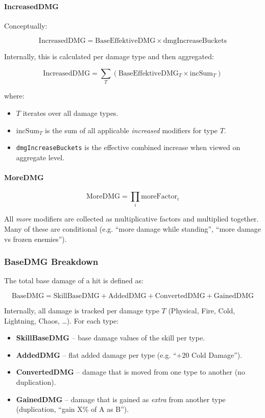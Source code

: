 \paragraph{IncreasedDMG}

Conceptually:

\[
\text{IncreasedDMG} = \text{BaseEffektiveDMG} \times \text{dmgIncreaseBuckets}
\]

Internally, this is calculated per damage type and then aggregated:

\[
\text{IncreasedDMG} = \sum_T \left(\text{BaseEffektiveDMG}_T \times \text{incSum}_T\right)
\]

where:

\begin{itemize}
	\item $T$ iterates over all damage types.
	\item $\text{incSum}_T$ is the sum of all applicable \emph{increased} modifiers for type $T$.
	\item \texttt{dmgIncreaseBuckets} is the effective combined increase when viewed on aggregate level.
\end{itemize}

\paragraph{MoreDMG}

\[
\text{MoreDMG} = \prod_i \text{moreFactor}_i
\]

All \emph{more} modifiers are collected as multiplicative factors and multiplied together. Many of these are conditional (e.g. ``more damage while standing'', ``more damage vs frozen enemies'').

\subsubsection{BaseDMG Breakdown}

The total base damage of a hit is defined as:

\[
\text{BaseDMG} = \text{SkillBaseDMG} + \text{AddedDMG} + \text{ConvertedDMG} + \text{GainedDMG}
\]

Internally, all damage is tracked per damage type $T$ (Physical, Fire, Cold, Lightning, Chaos, \dots). For each type:

\begin{itemize}
	\item \textbf{SkillBaseDMG} – base damage values of the skill per type.
	\item \textbf{AddedDMG} – flat added damage per type (e.g. ``+20 Cold Damage'').
	\item \textbf{ConvertedDMG} – damage that is moved from one type to another (no duplication).
	\item \textbf{GainedDMG} – damage that is gained as \emph{extra} from another type (duplication, ``gain X\% of A as B'').
\end{itemize}

